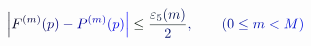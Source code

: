 \documentclass[12pt]{article}
\begin{document}
\makeatletter
\renewcommand*{\@textcolor}[3]{%
  \protect\leavevmode
  \begingroup
    \color#1{#2}#3%
  \endgroup
}
\makeatother
\begin{displaymath}
\mathcolor[RGB]{0,0,15}{\left|} \mathcolor[RGB]{0,0,30}{F} ^ { \mathcolor[RGB]{0,0,45}{(} \mathcolor[RGB]{0,0,60}{m} \mathcolor[RGB]{0,0,75}{)} } \mathcolor[RGB]{0,0,90}{(} \mathcolor[RGB]{0,0,105}{p} \mathcolor[RGB]{0,0,120}{)} \mathcolor[RGB]{0,0,135}{-} \mathcolor[RGB]{0,0,150}{P} ^ { \mathcolor[RGB]{0,0,165}{(} \mathcolor[RGB]{0,0,180}{m} \mathcolor[RGB]{0,0,195}{)} } \mathcolor[RGB]{0,0,210}{(} \mathcolor[RGB]{0,0,225}{p} \mathcolor[RGB]{0,0,240}{)} \mathcolor[RGB]{0,0,255}{\right|} \mathcolor[RGB]{0,15,0}{\leq} \mathcolor[RGB]{0,15,15}{\frac { \mathcolor[RGB]{0,15,30}{\varepsilon} _ { \mathcolor[RGB]{0,15,45}{5} } \mathcolor[RGB]{0,15,60}{(} \mathcolor[RGB]{0,15,75}{m} \mathcolor[RGB]{0,15,90}{)} } { \mathcolor[RGB]{0,15,105}{2} } } \mathcolor[RGB]{0,15,120}{,} \qquad \mathcolor[RGB]{0,15,135}{(} \mathcolor[RGB]{0,15,150}{0} \mathcolor[RGB]{0,15,165}{\leq} \mathcolor[RGB]{0,15,180}{m} \mathcolor[RGB]{0,15,195}{<} \mathcolor[RGB]{0,15,210}{M} \mathcolor[RGB]{0,15,225}{)}
\end{displaymath}
\end{document}
